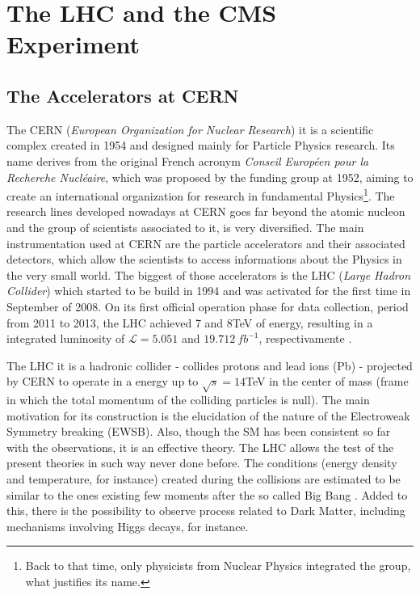 \chapter{The LHC and the CMS Experiment}

\section{The Accelerators at CERN}
The CERN (\textit{European Organization for Nuclear Research}) it is a scientific complex created in 1954 and designed mainly for Particle Physics research. Its name derives from the original French acronym \textit{Conseil Européen pour la Recherche Nucléaire}, which was proposed by the funding group at 1952, aiming to create an international organization for research in fundamental Physics\footnote{Back to that time, only physicists from Nuclear Physics integrated the group, what justifies its name.}. The research lines developed nowadays at CERN goes far beyond the atomic nucleon and the group of scientists associated to it, is very diversified. The main instrumentation used at CERN are the particle accelerators and their associated detectors, which allow the scientists to access informations about the Physics in the very small world. The biggest of those accelerators is the LHC (\textit{Large Hadron Collider}) which started to be build in 1994 and was activated for the first time in September of 2008. On its first official operation phase for data collection, period from 2011 to 2013, the LHC achieved 7 and 8TeV of energy, resulting in a integrated luminosity of $\mathcal{L} = 5.051$ and $19.712~fb^{-1}$, respectivamente \cite{bib:web-cern}.

The LHC it is a hadronic collider - collides protons and lead ions (Pb) - projected by CERN to operate in a energy up to $\sqrt{s}=14$TeV in the center of mass (frame in which the total momentum of the colliding particles is null). The main motivation for its construction is the elucidation of the nature of the Electroweak Symmetry breaking (EWSB). Also, though the SM has been consistent so far with the observations, it is an effective theory. The LHC allows the test of the present theories in such way never done before. The conditions (energy density and temperature, for instance) created during the collisions are estimated to be similar to the ones existing few moments after the so called Big Bang \cite{bib:lhc-guide}. Added to this, there is the possibility to observe process related to Dark Matter, including mechanisms involving Higgs decays, for instance. 


